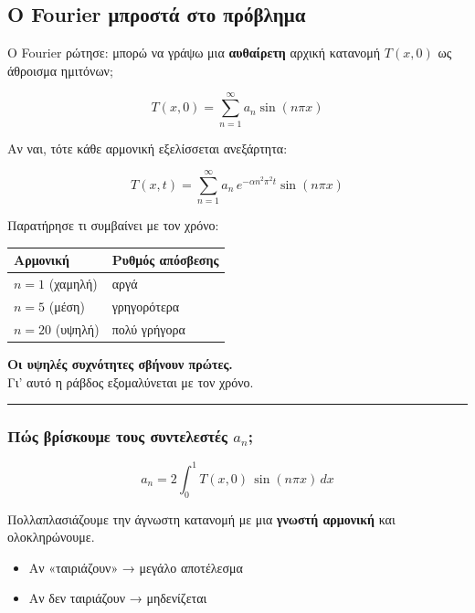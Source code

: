 \documentclass[
  a4paper,
  11pt,
]{article}
\providecommand{\tightlist}{%
  \setlength{\itemsep}{0pt}\setlength{\parskip}{0pt}}
\begin{document}
\subsection{Ο Fourier μπροστά στο
πρόβλημα}\label{ux3bf-fourier-ux3bcux3c0ux3c1ux3bfux3c3ux3c4ux3ac-ux3c3ux3c4ux3bf-ux3c0ux3c1ux3ccux3b2ux3bbux3b7ux3bcux3b1}

Ο Fourier ρώτησε: μπορώ να γράψω μια \textbf{αυθαίρετη} αρχική κατανομή
\(T(x, 0)\) ως άθροισμα ημιτόνων;

\[T(x, 0) = \sum_{n=1}^{\infty} a_n \sin(n\pi x)\]

Αν ναι, τότε κάθε αρμονική εξελίσσεται ανεξάρτητα:

\[T(x, t) = \sum_{n=1}^{\infty} a_n \, e^{-\alpha n^2 \pi^2 t} \sin(n\pi x)\]

Παρατήρησε τι συμβαίνει με τον χρόνο:

\begin{longtable}[]{@{}ll@{}}
\toprule\noalign{}
Αρμονική & Ρυθμός απόσβεσης \\
\midrule\noalign{}
\endhead
\bottomrule\noalign{}
\endlastfoot
\(n=1\) (χαμηλή) & αργά \\
\(n=5\) (μέση) & γρηγορότερα \\
\(n=20\) (υψηλή) & πολύ γρήγορα \\
\end{longtable}

\textbf{Οι υψηλές συχνότητες σβήνουν πρώτες.}\\
Γι' αυτό η ράβδος εξομαλύνεται με τον χρόνο.

\begin{center}\rule{0.5\linewidth}{0.5pt}\end{center}

\subsubsection{\texorpdfstring{Πώς βρίσκουμε τους συντελεστές
\(a_n\);}{Πώς βρίσκουμε τους συντελεστές a\_n;}}\label{ux3c0ux3ceux3c2-ux3b2ux3c1ux3afux3c3ux3baux3bfux3c5ux3bcux3b5-ux3c4ux3bfux3c5ux3c2-ux3c3ux3c5ux3bdux3c4ux3b5ux3bbux3b5ux3c3ux3c4ux3adux3c2-a_n}

\[a_n = 2\int_0^1 T(x,0)\,\sin(n\pi x)\,dx\]

Πολλαπλασιάζουμε την άγνωστη κατανομή με μια \textbf{γνωστή αρμονική}
και ολοκληρώνουμε.

\begin{itemize}
\tightlist
\item
  Αν «ταιριάζουν» → μεγάλο αποτέλεσμα
\item
  Αν δεν ταιριάζουν → μηδενίζεται
\end{itemize}
\end{document}
